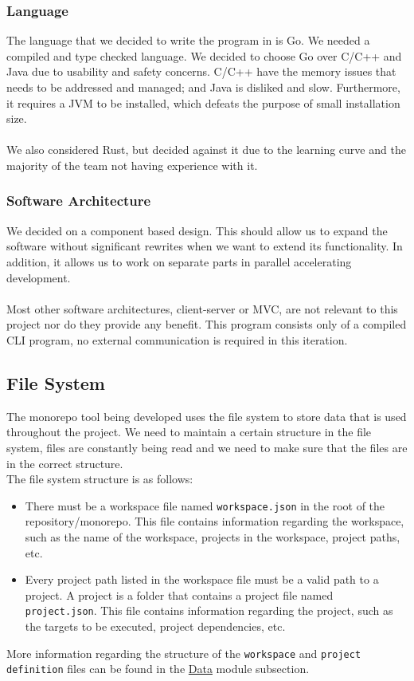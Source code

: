 \documentclass[11pt]{article}
\begin{document}
\subsubsection{Language}
\label{sec:lang}

The language that we decided to write the program in is Go. We needed a compiled
and type checked language. We decided to choose Go over C/C++ and Java due to usability and
safety concerns. C/C++ have the memory issues that needs to be addressed and managed; and
Java is disliked and slow. Furthermore, it requires a JVM to be installed, which
defeats the purpose of small installation size.
\\\\
We also considered Rust, but decided against it due to the learning curve and
the majority of the team not having experience with it.

\subsubsection{Software Architecture}

We decided on a component based design. This should allow us to expand the
software without significant rewrites when we want to extend its functionality.
In addition, it allows us to work on separate parts in parallel accelerating
development.
\\\\
Most other software architectures, client-server or MVC, are not relevant to
this project nor do they provide any benefit. This program consists only of a
compiled CLI program, no external communication is required in this iteration.

\subsection{File System}
The monorepo tool being developed uses the file system to store data that is used throughout the project. We need to maintain
a certain structure in the file system, files are constantly being read and we need to make sure that the files are in the correct structure.
\\
The file system structure is as follows:
\begin{itemize}
  \item There must be a workspace file named \texttt{workspace.json} in the root of the repository/monorepo.
  This file contains information regarding the workspace, such as the name of the workspace, projects in the
  workspace, project paths, etc.
  \item Every project path listed in the workspace file must be a valid path to a project. A project is a folder that contains a
  project file named \texttt{project.json}. This file contains information regarding the project, such as the \glspl{target} to
  be executed, project dependencies, etc.
\end{itemize}
More information regarding the structure of the \texttt{workspace} and \texttt{project definition} files can be found in the \hyperref[mod:data]{Data} module subsection.
\end{document}
